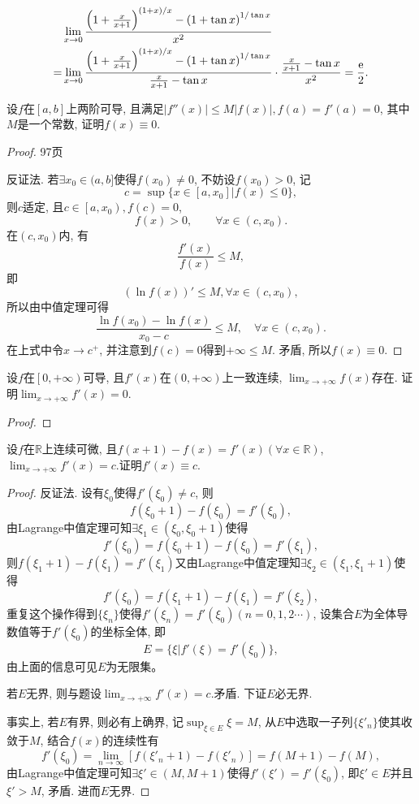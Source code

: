 \begin{quiza}
\begin{quizs}
\begin{solution}
\[\begin{split}
&\lim_{x\rightarrow 0}\frac{\left(1+\frac{x}{x+1}\right)^{(1+x)/x}-\left(1+\tan x\right)^{1/\tan x}}{x^2}\\=&\lim_{x\rightarrow 0}\frac{\left(1+\frac{x}{x+1}\right)^{(1+x)/x}-\left(1+\tan x\right)^{1/\tan x}}{\frac{x}{x+1}-\tan x}\cdot\frac{\frac{x}{x+1}-\tan x}{x^2}=\frac{\mathrm{e}}{2}.\qedhere
\end{split}\]
\end{solution}
\end{quizs}
\woe 设\(f\)在\([a,b]\)上两阶可导, 且满足\(|f''(x)|\leqslant M|f(x)|,f(a)=f'(a)=0\), 其中\(M\)是一个常数, 证明\(f(x)\equiv 0\).
\begin{proof}
97页

反证法. 若\(\exists x_0\in(a,b]\)使得\(f(x_0)\ne 0\), 不妨设\(f(x_0)>0\), 记\[c=\sup\{x\in[a,x_0]\big|f(x)\leqslant 0\},\]则\(c\)适定, 且\(c\in\left[a,x_0\right),f(c)=0\),\[f(x)>0,\qquad\forall x\in(c,x_0).\]在\((c,x_0)\)内, 有\[\frac{f'(x)}{f(x)}\leqslant M,\]即\[\left(\ln f(x)\right)'\leqslant M,\forall x\in(c,x_0),\]所以由中值定理可得\[\frac{\ln f(x_0)-\ln f(x)}{x_0-c}\leqslant M,\quad\forall x\in(c,x_0).\]在上式中令\(x\rightarrow c^+\), 并注意到\(f(c)=0\)得到\(+\infty\leqslant M\). 矛盾, 所以\(f(x)\equiv 0\).
\end{proof}
\woe 设\(f\)在\(\left[0,+\infty\right)\)可导, 且\(f'(x)\)在\(\left(0,+\infty\right)\)上一致连续, \(\lim_{x\rightarrow+\infty}f(x)\)存在. 证明\(\lim_{x\rightarrow+\infty}f'(x)=0.\)
\begin{proof}

\end{proof}
\woe 设\(f\)在\(\mathbb{R}\)上连续可微, 且\(f(x+1)-f(x)=f'(x)(\forall x\in\mathbb{R})\), \(\lim_{x\rightarrow+\infty}f'(x)=c.\)证明\(f'(x)\equiv c\).
\begin{proof}
反证法. 设有\(\xi_0\)使得\(f'(\xi_0)\ne c\), 则\[f(\xi_0+1)-f(\xi_0)=f'(\xi_0),\] 由Lagrange中值定理可知\(\exists \xi_1\in(\xi_0,\xi_0+1)\)使得\[f'(\xi_0)=f(\xi_0+1)-f(\xi_0)=f'(\xi_1),\] 则\(f(\xi_1+1)-f(\xi_1)=f'(\xi_1)\)又由Lagrange中值定理知\(\exists \xi_2\in(\xi_1,\xi_1+1)\)使得\[f'(\xi_0)=f(\xi_1+1)-f(\xi_1)=f'(\xi_2),\]重复这个操作得到\(\{\xi_n\}\)使得\(f'(\xi_n)=f'(\xi_0)(n=0,1,2\cdots)\), 设集合\(E\)为全体导数值等于\(f'(\xi_0)\)的坐标全体, 即\[E=\{\xi\big|f'(\xi)=f'(\xi_0)\},\]由上面的信息可见\(E\)为无限集。

若\(E\)无界, 则与题设\(\lim_{x\rightarrow+\infty}f'(x)=c.\)矛盾. 下证\(E\)必无界. 

事实上, 若\(E\)有界, 则必有上确界, 记\(\sup_{\xi\in E}\xi =M\), 从\(E\)中选取一子列\(\{\xi'_n\}\)使其收敛于\(M\), 结合\(f(x)\)的连续性有\[f'(\xi_0)=\lim_{n\rightarrow\infty}\left[f(\xi'_n+1)-f(\xi'_n)\right]=f(M+1)-f(M),\]由Lagrange中值定理可知\(\exists \xi'\in(M,M+1)\)使得\(f'(\xi')=f'(\xi_0)\), 即\(\xi'\in E\)并且\(\xi'>M\), 矛盾. 进而\(E\)无界.
\end{proof}
\end{quiza}
